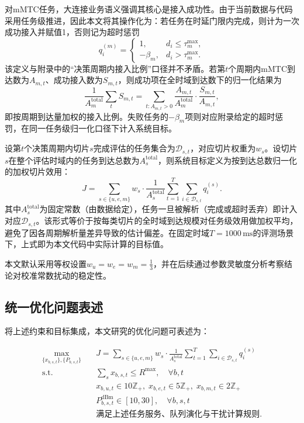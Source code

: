 \documentclass[UTF8,a4paper,12pt,fontset=fandol]{ctexart}
\begin{document}
对mMTC任务，大连接业务语义强调其核心是接入成功性。由于当前数据与代码采用任务级推进，因此本文将其操作化为：若任务在时延门限内完成，则计为一次成功接入并赋值1，否则记为超时惩罚
\begin{equation}
  q_i^{(m)}=
  \begin{cases}
    1, & d_i\le \tau_m^{\max},\\
    -\beta_m, & d_i> \tau_m^{\max}.
  \end{cases}
\end{equation}
该定义与附录中的``决策周期内接入比例''口径并不矛盾。若第$t$个周期内mMTC到达数为$A_{m,t}$、成功接入数为$S_{m,t}$，则成功项在全时域到达数下的归一化结果为
\begin{equation}
  \frac{1}{A_m^{\text{total}}}\sum_t S_{m,t}
  =
  \sum_{t:A_{m,t}>0} \frac{A_{m,t}}{A_m^{\text{total}}}\cdot
  \frac{S_{m,t}}{A_{m,t}},
\end{equation}
即按周期到达量加权的接入比例。失败任务的$-\beta_m$项则对应附录给定的超时惩罚，在同一任务级归一化口径下计入系统目标。

设第$t$个决策周期内切片$s$完成评估的任务集合为$\mathcal{D}_{s,t}$，对应切片权重为$w_s$。设切片$s$在整个评估时域内的任务到达总数为$A_s^{\text{total}}$，则系统目标定义为按到达总数归一化的加权切片效用：
\begin{equation}
  J = \sum_{s\in\{u,e,m\}}
  w_s\cdot \frac{1}{A_s^{\text{total}}}
  \sum_{t=1}^{T}\sum_{i\in\mathcal{D}_{s,t}} q_i^{(s)}.
  \label{eq:objective}
\end{equation}
其中$A_s^{\text{total}}$为固定常数（由数据给定），任务一旦被解析（完成或超时丢弃）即计入对应$\mathcal{D}_{s,t}$。该形式等价于按每类切片的全时域到达规模对任务级效用做加权平均，避免了因各周期解析量差异导致的估计偏差。在固定时域$T=1000\,\mathrm{ms}$的评测场景下，上式即为本文代码中实际计算的目标值。

本文默认采用等权设置$w_u=w_e=w_m=\frac{1}{3}$，并在后续通过参数灵敏度分析考察结论对校准常数扰动的稳定性。

\subsection{统一优化问题表述}

将上述约束和目标集成，本文研究的优化问题可表述为：

\begin{subequations}
\begin{align}
  \max_{\{x_{b,s,t}\},\{P_{b,s,t}\}} \quad
  & J = \sum_{s\in\{u,e,m\}} w_s\cdot \frac{1}{A_s^{\text{total}}}
        \sum_{t=1}^{T}\sum_{i\in\mathcal{D}_{s,t}} q_i^{(s)}
        \label{eq:opt_obj} \\[4pt]
  \text{s.t.} \quad
  & \sum_{s} x_{b,s,t} \le R^{\max},\quad \forall b,t \label{eq:opt_rb} \\
  & x_{b,u,t}\in 10\mathbb{Z}_+,\; x_{b,e,t}\in 5\mathbb{Z}_+,\; x_{b,m,t}\in 2\mathbb{Z}_+ \label{eq:opt_gran} \\
  & P_{b,s,t}^{\text{dBm}}\in [10,30],\quad \forall b,s,t \label{eq:opt_pow} \\
  & \text{满足上述任务服务、队列演化与干扰计算规则}.
        \label{eq:opt_env}
\end{align}
\end{subequations}
\end{document}
